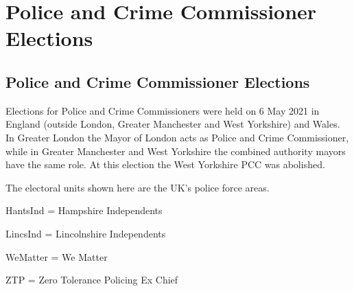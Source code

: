 \part{Police and Crime Commissioner Elections}

\chapter{Police and Crime Commissioner Elections}

Elections for Police and Crime Commissioners were held on 6 May 2021 in England (outside London, Greater Manchester and West Yorkshire) and Wales.  In Greater London the Mayor of London acts as Police and Crime Commissioner, while in Greater Manchester and West Yorkshire the combined authority mayors have the same role.  At this election the West Yorkshire PCC was abolished.

The electoral units shown here are the UK's police force areas.

%
%
HantsInd = Hampshire Independents

%
LincsInd = Lincolnshire Independents

WeMatter = We Matter

ZTP = Zero Tolerance Policing Ex Chief


